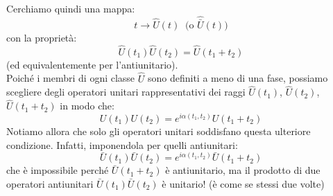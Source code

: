 \documentclass[../../FisicaTeorica.tex]{subfiles}
\begin{document}
Cerchiamo quindi una mappa:
\[
t\to \hat{U}(t)\> \text{ (o $\widehat{\bar{U}}(t)$)}
\]
con la proprietà:
\[
\hat{U}\left(t_1\right)\hat{U}\left(t_2\right)=\hat{U}\left(t_1+t_2\right)
\]
(ed equivalentemente per l'antiunitario).\\
Poiché i membri di ogni classe $\hat{U}$ sono definiti a meno di una fase, possiamo scegliere degli operatori unitari rappresentativi dei raggi $\hat{U}\left(t_1\right)$, $\hat{U}\left(t_2\right)$, $\hat{U}\left(t_1+t_2\right)$ in modo che:
\[
U\left(t_1\right)U\left(t_2\right)=e^{i\alpha\left(t_1,t_2\right)}U\left(t_1+t_2\right)
\]
Notiamo allora che solo gli operatori unitari soddisfano questa ulteriore condizione. Infatti, imponendola per quelli antiunitari:
\[
\bar{U}\left(t_1\right)\bar{U}\left(t_2\right)=e^{i\alpha\left(t_1,t_2\right)}\bar{U}\left(t_1+t_2\right)
\]
che è impossibile perché $\bar{U}\left(t_1+t_2\right)$ è antiunitario, ma il prodotto di due operatori antiunitari $\bar{U}\left(t_1\right)\bar{U}\left(t_2\right)$ è unitario! (è come se stessi  due volte) %
\end{document}
